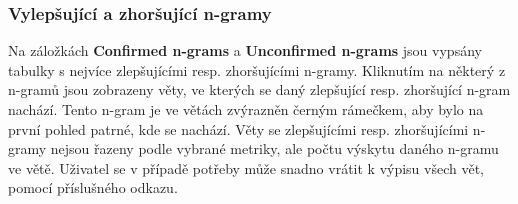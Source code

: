 \subsubsection{Vylepšující a zhoršující n-gramy}
Na záložkách \textbf{Confirmed n-grams} a \textbf{Unconfirmed n-grams} jsou vypsány tabulky s nejvíce zlepšujícími resp. zhoršujícími n-gramy.
Kliknutím na některý z n-gramů jsou zobrazeny věty,
  ve kterých se daný zlepšující resp. zhoršující n-gram nachází.
Tento n-gram je ve větách zvýrazněn černým rámečkem,
  aby bylo na první pohled patrné,
  kde se nachází.
Věty se zlepšujícími resp. zhoršujícími n-gramy nejsou řazeny podle vybrané metriky,
  ale počtu výskytu daného n-gramu ve větě.
Uživatel se v případě potřeby může snadno vrátit k výpisu všech vět, pomocí příslušného odkazu.



